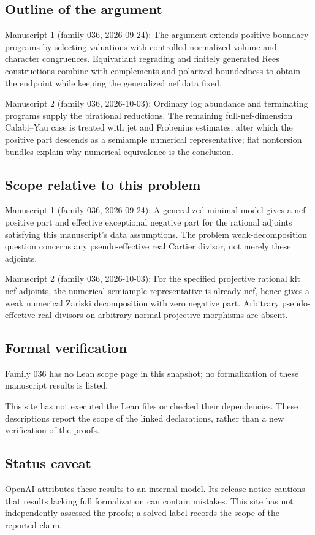 \documentclass[11pt]{article}
\begin{document}
\subsection{Outline of the argument}
Manuscript 1 (family 036, 2026-09-24): The argument extends positive-boundary programs by selecting valuations with controlled normalized volume and character congruences. Equivariant regrading and finitely generated Rees constructions combine with complements and polarized boundedness to obtain the endpoint while keeping the generalized nef data fixed.

Manuscript 2 (family 036, 2026-10-03): Ordinary log abundance and terminating programs supply the birational reductions. The remaining full-nef-dimension Calabi--Yau case is treated with jet and Frobenius estimates, after which the positive part descends as a semiample numerical representative; flat nontorsion bundles explain why numerical equivalence is the conclusion.

\subsection{Scope relative to this problem}
Manuscript 1 (family 036, 2026-09-24): A generalized minimal model gives a nef positive part and effective exceptional negative part for the rational adjoints satisfying this manuscript's data assumptions. The problem weak-decomposition question concerns any pseudo-effective real Cartier divisor, not merely these adjoints.

Manuscript 2 (family 036, 2026-10-03): For the specified projective rational klt nef adjoints, the numerical semiample representative is already nef, hence gives a weak numerical Zariski decomposition with zero negative part. Arbitrary pseudo-effective real divisors on arbitrary normal projective morphisms are absent.

\subsection{Formal verification}
Family 036 has no Lean scope page in this snapshot; no formalization of these manuscript results is listed.

This site has not executed the Lean files or checked their dependencies. These descriptions report the scope of the linked declarations, rather than a new verification of the proofs.

\subsection{Status caveat}
OpenAI attributes these results to an internal model. Its release notice cautions that results lacking full formalization can contain mistakes. This site has not independently assessed the proofs; a solved label records the scope of the reported claim.
\end{document}
